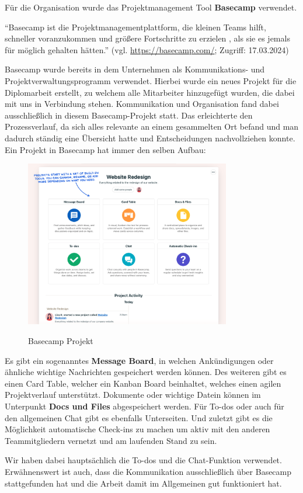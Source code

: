 Für die Organisation wurde das Projektmanagement Tool \textbf{Basecamp} verwendet.

“Basecamp ist die Projektmanagementplattform, die kleinen Teams hilft, schneller voranzukommen und größere Fortschritte zu erzielen , als sie es jemals für möglich gehalten hätten.”
\newline
(vgl. \url{https://basecamp.com/}; Zugriff: 17.03.2024)

Basecamp wurde bereits in dem Unternehmen als Kommunikations- und Projektverwaltungsprogramm verwendet. Hierbei wurde ein neues Projekt für die Diplomarbeit erstellt, zu welchem alle Mitarbeiter hinzugefügt wurden, die dabei mit uns in Verbindung stehen.
Kommunikation und Organisation fand dabei ausschließlich in diesem Basecamp-Projekt statt. Das erleichterte den Prozessverlauf, da sich alles relevante an einem gesammelten Ort befand und man dadurch ständig eine Übersicht hatte und Entscheidungen nachvollziehen konnte.
Ein Projekt in Basecamp hat immer den selben Aufbau:

\begin{figure}[h!]
    \centering
    \includegraphics[width=0.8\textwidth]{pics/basecamp-project-overview.png}
    \caption{Basecamp Projekt}
    \cite{basecamp_project}
    \label{fig:mesh1}
\end{figure}

Es gibt ein sogenanntes \textbf{Message Board}, in welchen Ankündigungen oder ähnliche wichtige Nachrichten gespeichert werden können. Des weiteren gibt es einen Card Table, welcher ein Kanban Board beinhaltet, welches einen agilen Projektverlauf unterstützt. Dokumente oder wichtige Datein können im Unterpunkt \textbf{Docs und Files} abgespeichert werden. Für To-dos oder auch für den allgemeinen Chat gibt es ebenfalls Unterseiten. Und zuletzt gibt es die Möglichkeit automatische Check-ins zu machen um aktiv mit den anderen Teammitgliedern vernetzt und am laufenden Stand zu sein.

Wir haben dabei hauptsächlich die To-dos und die Chat-Funktion verwendet. Erwähnenswert ist auch, dass die Kommunikation ausschließlich über Basecamp stattgefunden hat und die Arbeit damit im Allgemeinen gut funktioniert hat.